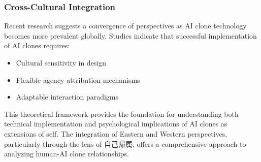 \subsubsection{Cross-Cultural Integration}
Recent research suggests a convergence of perspectives as AI clone technology becomes more prevalent globally. Studies indicate that successful implementation of AI clones requires:
\begin{itemize}
\item Cultural sensitivity in design
\item Flexible agency attribution mechanisms
\item Adaptable interaction paradigms
\end{itemize}

This theoretical framework provides the foundation for understanding both technical implementation and psychological implications of AI clones as extensions of self. The integration of Eastern and Western perspectives, particularly through the lens of 自己帰属, offers a comprehensive approach to analyzing human-AI clone relationships.
